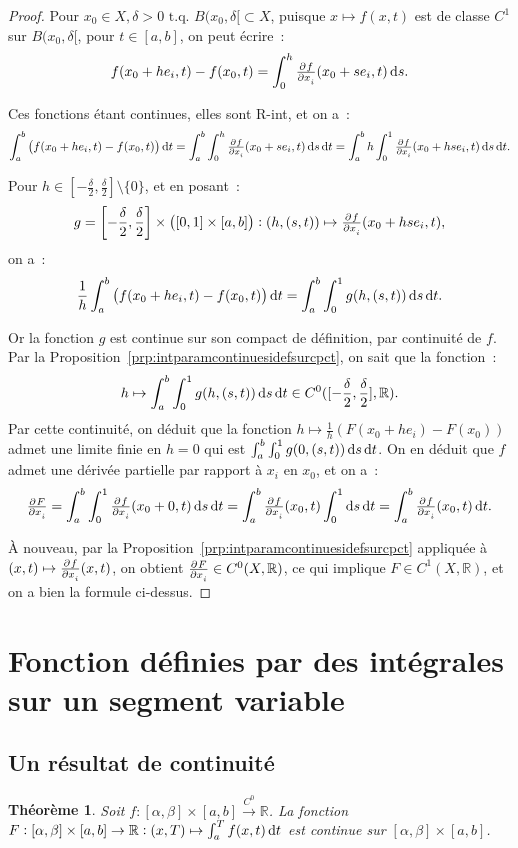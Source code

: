 \documentclass{report}
\newtheorem{thm}{Théorème}[chapter]
\theoremstyle{definition}
\theoremstyle{remark}
\newcommand{\R}{\mathbb R}
\newcommand{\tq}{\text{ t.q. }}
\newcommand{\toC}[1]{\xrightarrow{C^{#1}}}
\newcommand{\tocont}{\toC 0}
\begin{document}
			\begin{proof} Pour $x_0 \in X, \delta > 0 \tq B(x_0, \delta[ \subset X$, puisque $x \mapsto f(x, t)$ est de classe $C^1$ sur $B(x_0, \delta[$,
			pour $t \in [a, b]$, on peut écrire~:
			\[f(x_0 + he_i, t) - f(x_0, t) = \int_0^h \pd f{x_i}(x_0 + se_i, t)\dif s.\]

			Ces fonctions étant continues, elles sont R-int, et on a~:
			\[\int_a^b\left(f(x_0 + he_i, t) - f(x_0, t)\right)\dif t = \int_a^b\int_0^h \pd f{x_i}(x_0 + se_i, t)\dif s\dif t
				= \int_a^b h\int_0^1\pd f{x_i}(x_0 + hse_i, t)\dif s\dif t.\]

			Pour $h \in \left[-\frac \delta2, \frac \delta2\right] \setminus \{0\}$, et en posant~:
			\[g = \left[-\frac \delta2, \frac \delta2\right] \times \left([0, 1] \times [a, b]\right) : (h, (s, t)) \mapsto \pd f{x_i}(x_0 + hse_i, t),\]
			on a~:
			\[\frac 1h\int_a^b \left(f(x_0 + he_i, t) - f(x_0, t)\right)\dif t = \int_a^b\int_0^1g(h, (s, t))\dif s\dif t.\]

			Or la fonction $g$ est continue sur son compact de définition, par continuité de $f$. Par la Proposition~\ref{prp:intparamcontinuesidefsurcpct}, on
			sait que la fonction~:
			\[h \mapsto \int_a^b\int_0^1g(h, (s, t))\dif s\dif t \in C^0([-\frac \delta2, \frac \delta2], \R).\]
			Par cette continuité, on déduit que la fonction $h \mapsto \frac 1h\left(F(x_0 + he_i) - F(x_0)\right)$ admet une limite finie en $h=0$ qui est
			$\int_a^b\int_0^1g(0, (s, t))\dif s\dif t$. On en déduit que $f$ admet une dérivée partielle par rapport à $x_i$ en $x_0$, et on a~:
			\[\pd F{x_i} = \int_a^b\int_0^1\pd f{x_i}(x_0 + 0, t)\dif s\dif t = \int_a^b\pd f{x_i}(x_0, t)\int_0^1\dif s\dif t = \int_a^b\pd f{x_i}(x_0, t)\dif t.\]

			À nouveau, par la Proposition~\ref{prp:intparamcontinuesidefsurcpct} appliquée à $(x, t) \mapsto \pd f{x_i}(x, t)$, on obtient
			$\pd F{x_i} \in C^0(X, \R)$, ce qui implique $F \in C^1(X, \R)$, et on a bien la formule ci-dessus.
			\end{proof}

	\section{Fonction définies par des intégrales sur un segment variable}
		\subsection{Un résultat de continuité}
			\begin{thm}\label{thm:continuitésegmentvariable} Soit $f : [\alpha, \beta] \times [a, b] \tocont \R$. La fonction
			$F : [\alpha, \beta] \times [a, b] \to \R : (x, T) \mapsto \int_a^Tf(x, t)\dif t$ est continue sur $[\alpha, \beta] \times [a, b]$.
			\end{thm}
\end{document}
